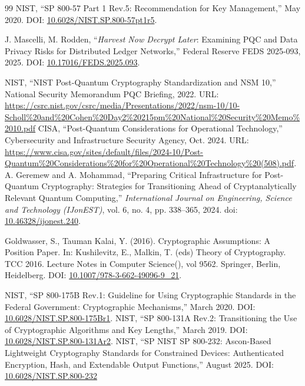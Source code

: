 \documentclass[11pt,a4paper]{article}
\begin{document}
\begin{thebibliography}{99}
 NIST, ``SP 800-57 Part 1 Rev.5: Recommendation for Key Management,'' May 2020. DOI: \href{https://nvlpubs.nist.gov/nistpubs/SpecialPublications/NIST.SP.800-57pt1r5.pdf}{10.6028/NIST.SP.800-57pt1r5}.

 J. Mascelli, M. Rodden, ``\emph{Harvest Now Decrypt Later}: Examining PQC and Data Privacy Risks for Distributed Ledger Networks,'' Federal Reserve FEDS 2025-093, 2025. DOI: \href{https://www.federalreserve.gov/econres/feds/files/2025093pap.pdf}{10.17016/FEDS.2025.093}.

NIST, “NIST Post-Quantum Cryptography Standardization and NSM 10,” 
National Security Memorandum PQC Briefing, 2022. 
URL: \url{https://csrc.nist.gov/csrc/media/Presentations/2022/nsm-10/10-Scholl%20and%20Cohen%20Day2%20215pm%20National%20Security%20Memo%2010.pdf}
CISA, “Post-Quantum Considerations for Operational Technology,” 
Cybersecurity and Infrastructure Security Agency, Oct. 2024. 
URL: \url{https://www.cisa.gov/sites/default/files/2024-10/Post-Quantum%20Considerations%20for%20Operational%20Technology%20(508).pdf}.
A. Geremew and A. Mohammad,
``Preparing Critical Infrastructure for Post-Quantum Cryptography: Strategies for Transitioning Ahead of Cryptanalytically Relevant Quantum Computing,''
\emph{International Journal on Engineering, Science and Technology (IJonEST)}, 
vol. 6, no. 4, pp. 338--365, 2024.
doi: \href{https://doi.org/10.46328/ijonest.240}{10.46328/ijonest.240}.

Goldwasser, S., Tauman Kalai, Y. (2016). Cryptographic Assumptions: A Position Paper. In: Kushilevitz, E., Malkin, T. (eds) Theory of Cryptography. TCC 2016. Lecture Notes in Computer Science(), vol 9562. Springer, Berlin, Heidelberg. DOI: \href{https://doi.org/10.1007/978-3-662-49096-9\_21}{10.1007/978-3-662-49096-9\_21}.

 NIST, ``SP 800-175B Rev.1: Guideline for Using Cryptographic Standards in the Federal Government: Cryptographic Mechanisms,'' March 2020. DOI: \href{https://nvlpubs.nist.gov/nistpubs/SpecialPublications/NIST.SP.800-175Br1.pdf}{10.6028/NIST.SP.800-175Br1}.
 NIST, ``SP 800-131A Rev.2: Transitioning the Use of Cryptographic Algorithms and Key Lengths,'' March 2019. DOI: \href{https://nvlpubs.nist.gov/nistpubs/SpecialPublications/NIST.SP.800-131Ar2.pdf}{10.6028/NIST.SP.800-131Ar2}.
 NIST, ``SP NIST SP 800-232: Ascon-Based Lightweight Cryptography Standards for Constrained Devices: Authenticated Encryption, Hash, and Extendable Output Functions,'' August 2025. DOI: \href{https://doi.org/10.6028/NIST.SP.800-232}{10.6028/NIST.SP.800-232}


\end{thebibliography}
\end{document}
